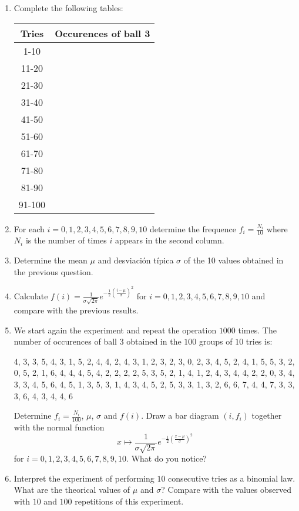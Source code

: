 \begin{enumerate}
\item Complete the following tables:

\begin{tabular}{| c | c |}
  \hline
  Tries &  Occurences of ball 3 \\
  \hline
  1-10 &   \\
  \hline
  11-20 &  \\
  \hline
  21-30 &  \\
  \hline
  31-40 &  \\
  \hline
  41-50 &  \\
  \hline
  51-60 &  \\
  \hline
  61-70 &  \\
  \hline
  71-80 &  \\
  \hline
  81-90 &  \\
  \hline
  91-100 & \\
  \hline
\end{tabular}

\item
  For each $i=0,1,2,3,4,5,6,7,8,9,10$
  determine the frequence $f_i = \frac{N_i}{10}$
  where $N_i$ is the number of times $i$ appears in the second column.

\item Determine the mean $\mu$ and desviación típica $\sigma$ of the 10 values
  obtained in the previous question.

\item Calculate
  $f(i)=\frac{1}{\sigma \sqrt{2\pi}} e^{-\frac{1}{2} \left(\frac{i-\mu}{\sigma}\right)^2}$
  for $i=0,1,2,3,4,5,6,7,8,9,10$ and compare with the previous results.

\item We start again the experiment and repeat the operation $1000$ times.
  The number of occurences of ball $3$ obtained in the $100$ groups of $10$
  tries is:

  4, 3, 3, 5, 4, 3, 1, 5, 2, 4, 4, 2, 4, 3, 1, 2, 3, 2, 3, 0, 2, 3, 4, 5, 2, 4, 1, 5, 5, 3, 2, 0, 5, 2, 1, 6, 4, 4, 4, 5, 4, 2, 2, 2, 2, 5, 3, 5, 2, 1, 4, 1, 2, 4, 3, 4, 4, 2, 2, 0, 3, 4, 3, 3, 4, 5, 6, 4, 5, 1, 3, 5, 3, 1, 4, 3, 4, 5, 2, 5, 3, 3, 1, 3, 2, 6, 6, 7, 4, 4, 7, 3, 3, 3, 6, 4, 3, 4, 4, 6

  Determine $f_i = \frac{N_i}{100}$, $\mu$, $\sigma$ and $f(i)$.
  Draw a bar diagram $(i,f_i)$ together with the normal function
  $$x \mapsto
  \frac{1}{\sigma \sqrt{2\pi}} e^{-\frac{1}{2} \left(\frac{x-\mu}{\sigma}\right)^2}$$
  for $i=0,1,2,3,4,5,6,7,8,9,10$.
  What do you notice?

\item Interpret the experiment of performing $10$ consecutive tries
  as a binomial law. What are the theorical values of $\mu$ and $\sigma$?
  Compare with the values observed with $10$ and $100$ repetitions of this
  experiment.

\end{enumerate}

